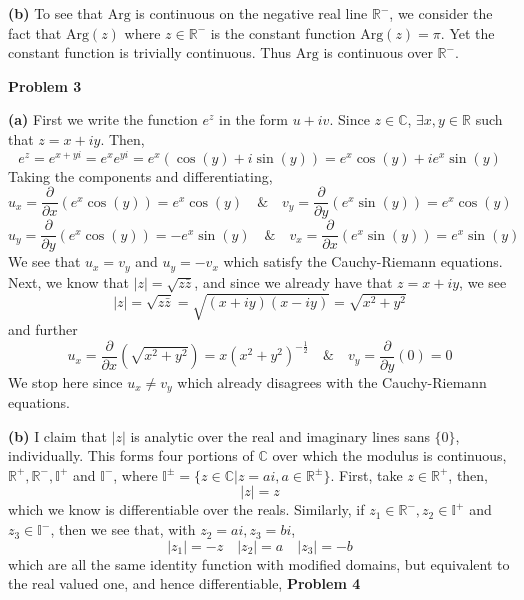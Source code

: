 \documentclass[10pt]{article}
\newcommand{\R}{\mathbb{R}}
\newcommand{\C}{\mathbb{C}}
\newcommand{\Arg}{\text{Arg}}
\begin{document}
\textbf{(b)} To see that $\Arg$ is continuous on the negative real line $\R^{-}$, we consider the fact that $\Arg(z)$ where $z \in \R^{-}$ is the constant function $\Arg(z) = \pi$. Yet the constant function is trivially continuous. Thus $\Arg$ is continuous over $\R^{-}$.

\textbf{Problem 3}

\textbf{(a)}
First we write the function $e^{z}$ in the form $u + iv$. Since $z\in\C$, $\exists x,y\in\R$ such that $z= x+iy$. Then,
$$e^{z} = e^{x+yi} = e^{x}e^{yi} = e^{x}(\cos(y) + i\sin(y)) = e^{x}\cos(y) + ie^{x}\sin(y)$$
Taking the components and differentiating,
$$u_{x} = \frac{\partial}{\partial x}(e^{x}\cos(y)) = e^{x}\cos(y) \hspace{1em} \& \hspace{1em} v_{y} = \frac{\partial}{\partial y}(e^{x}\sin(y)) = e^{x}\cos(y)$$
$$u_{y} = \frac{\partial}{\partial y}(e^{x}\cos(y)) = -e^{x}\sin(y) \hspace{1em} \& \hspace{1em} v_{x} = \frac{\partial}{\partial x}(e^{x}\sin(y)) = e^{x}\sin(y)$$
We see that $u_{x} = v_{y}$ and $u_{y} = -v_{x}$ which satisfy the Cauchy-Riemann equations. Next, we know that $|z| = \sqrt{z\bar{z}}$, and since we already have that $z = x+iy$, we see
$$|z| = \sqrt{z\bar{z}} = \sqrt{(x+iy)(x-iy)} = \sqrt{x^{2}+y^{2}}$$
and further
$$u_{x} = \frac{\partial}{\partial x}(\sqrt{x^{2} + y^{2}}) = x(x^{2} + y^{2})^{-\frac{1}{2}} \hspace{1em} \& \hspace{1em} v_{y} = \frac{\partial}{\partial y}(0) = 0$$
We stop here since $u_{x} \neq v_{y}$ which already disagrees with the Cauchy-Riemann equations.

\textbf{(b)}
I claim that $|z|$ is analytic over the real and imaginary lines sans $\{0\}$, individually. This forms four portions of $\C$ over which the modulus is continuous, $\R^{+}, \R^{-}, \mathbb{I}^{+}$ and $\mathbb{I}^{-}$, where $\mathbb{I}^{\pm} = \{ z\in\C |z = ai, a \in \R^{\pm}\}$. First, take $z\in \R^{+}$, then,
$$|z| = z$$
which we know is differentiable over the reals. Similarly, if $z_{1}\in\R^{-}, z_{2}\in\mathbb{I}^{+}$ and $z_{3}\in\mathbb{I}^{-}$, then we see that, with $z_{2} = ai, z_{3} = bi$,
$$|z_{1}| = -z \hspace{1em} |z_{2}| = a \hspace{1em} |z_{3}| = -b$$
which are all the same identity function with modified domains, but equivalent to the real valued one, and hence differentiable,
\newpage
\textbf{Problem 4}
\end{document}
